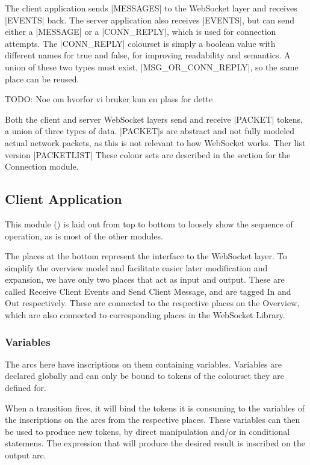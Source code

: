 	The client application sends |MESSAGES| to the WebSocket layer and
	receives |EVENTS| back. The server application also receives
	|EVENTS|, but can send either a |MESSAGE| or a
	|CONN_REPLY|, which is used for connection attempts. The
	|CONN_REPLY| colourset is simply a boolean value with different
	names for true and false, for improving readability and semantics. A union of
	these two types must exist, |MSG_OR_CONN_REPLY|, so the same place
	can be reused.
	
	TODO: Noe om hvorfor vi bruker kun en plass for dette
	
	Both the client and server WebSocket layers send and receive
	|PACKET| tokens, a union of three types of data. |PACKET|s
	are abstract and not fully modeled actual network packets, as this is not
	relevant to how WebSocket works. Ther list version |PACKETLIST| These
	colour sets are described in the section for the Connection module.

\subsection{Client Application}

	
	This module () is laid out from top to bottom to loosely show
	the sequence of operation, as is most of the other modules.
	
	The places at the bottom represent the interface to the WebSocket layer. To
	simplify the overview model and facilitate easier later modification
	and expansion, we have only two places that act as input and output. These are
	called Receive Client Events and Send Client Message, and are tagged In and
	Out respectively. These are connected to the respective places on the
	Overview, which are also connected to corresponding places in the WebSocket
	Library.
	
	
	\subsubsection{Variables}
	
		The arcs here have inscriptions on them containing variables. Variables are
		declared globally and can only be bound to tokens of the colourset they are
		defined for. 
		
		When a transition fires, it will bind the tokens it is consuming to the
		variables of the inscriptions on the arcs from the respective places. These
		variables can then be used to produce new tokens, by direct manipulation
		and/or in conditional statemens. The expression that will produce the desired
		result is inscribed on the output arc. 
		
